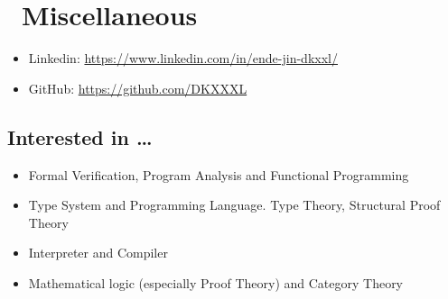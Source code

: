 \documentclass{resume}
\begin{document}

\section{\faInfo\ Miscellaneous}
\begin{itemize}[parsep=0.5ex]
  \item Linkedin: \url{https://www.linkedin.com/in/ende-jin-dkxxl/}
  \item GitHub: \url{https://github.com/DKXXXL}
\end{itemize}

\subsection{\textbf{Interested in …}}
\begin{itemize}
\item Formal Verification, Program Analysis and Functional Programming
\item Type System and Programming Language. Type Theory, Structural Proof Theory
\item Interpreter and Compiler
\item Mathematical logic (especially Proof Theory) and Category Theory
\end{itemize}

%
%
\end{document}
